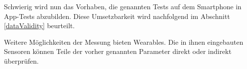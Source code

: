 Schwierig wird nun das Vorhaben, die genannten Tests auf dem Smartphone in App-Tests abzubilden. Diese Umsetzbarkeit wird nachfolgend im Abschnitt \ref{dataValidity} beurteilt.

Weitere Möglichkeiten der Messung bieten Wearables. Die in ihnen eingebauten Sensoren können Teile der vorher genannten Parameter direkt oder indirekt überprüfen.


